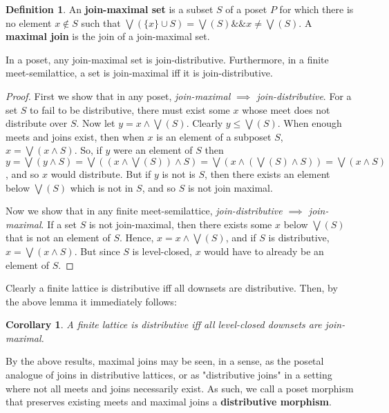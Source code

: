 \documentclass[hoptionsi,review,format=sigplan]{acmart}
\newtheorem*{corollary}{Corollary}
\theoremstyle{definition}
\newtheorem{definition}{Definition}[section]
\begin{document}
\begin{definition}
An \textbf{join-maximal set} is a subset \(S\) of a poset \(P\) for which there is no element \(x \notin S\) such that \(\bigvee(\{x\} \cup S) = \bigvee(S) \mathbin{\&\&} x \neq \bigvee(S)\). A \textbf{maximal join} is the join of a join-maximal set.
\end{definition}

\begin{lemma}
In a poset, any join-maximal set is join-distributive. Furthermore, in a finite meet-semilattice, a set is join-maximal iff it is join-distributive.
\end{lemma}
\begin{proof}


First we show that in any poset, \textit{join-maximal \(\implies\) join-distributive}. For a set \(S\) to fail to be distributive, there must exist some \(x\) whose meet does not distribute over \(S\). Now let \(y = x \wedge \bigvee(S)\). Clearly \(y \leq \bigvee(S)\). When enough meets and joins exist, then when \(x\) is an element of a subposet \(S\), \(x = \bigvee(x \wedge S)\). So, if \(y\) were an element of \(S\) then \(y = \bigvee(y \wedge S) = \bigvee((x \wedge \bigvee(S)) \wedge S)  =  \bigvee(x \wedge (\bigvee(S) \wedge S)) = \bigvee(x \wedge S)\), and so \(x\) would distribute. But if \(y\) is not is \(S\), then there exists an element below \(\bigvee(S)\) which is not in \(S\), and so \(S\) is not join maximal.

Now we show that in any finite meet-semilattice, \textit{join-distributive \(\implies\) join-maximal}. If a set \(S\) is not join-maximal, then there exists some \(x\) below \(\bigvee(S)\) that is not an element of \(S\). Hence, \(x = x \wedge \bigvee(S)\), and if \(S\) is distributive, \(x = \bigvee(x \wedge S)\).  But since \(S\) is level-closed, \(x\) would have to already be an element of \(S\).

\end{proof}

Clearly a finite lattice is distributive iff all downsets are distributive. Then, by the above lemma it immediately follows:

\begin{corollary}
A finite lattice is distributive iff all level-closed downsets are join-maximal.
\end{corollary}

By the above results, maximal joins may be seen, in a sense, as the posetal analogue of joins in distributive lattices, or as "distributive joins" in a setting where not all meets and joins necessarily exist. As such, we call a poset morphism that preserves existing meets and maximal joins a \textbf{distributive morphism}.
\end{document}
